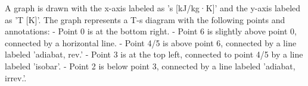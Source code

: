A graph is drawn with the x-axis labeled as 's [kJ/kg·K]' and the y-axis labeled as 'T [K]'. The graph represents a T-s diagram with the following points and annotations:  
- Point 0 is at the bottom right.  
- Point 6 is slightly above point 0, connected by a horizontal line.  
- Point 4/5 is above point 6, connected by a line labeled 'adiabat, rev.'  
- Point 3 is at the top left, connected to point 4/5 by a line labeled 'isobar'.  
- Point 2 is below point 3, connected by a line labeled 'adiabat, irrev.'.